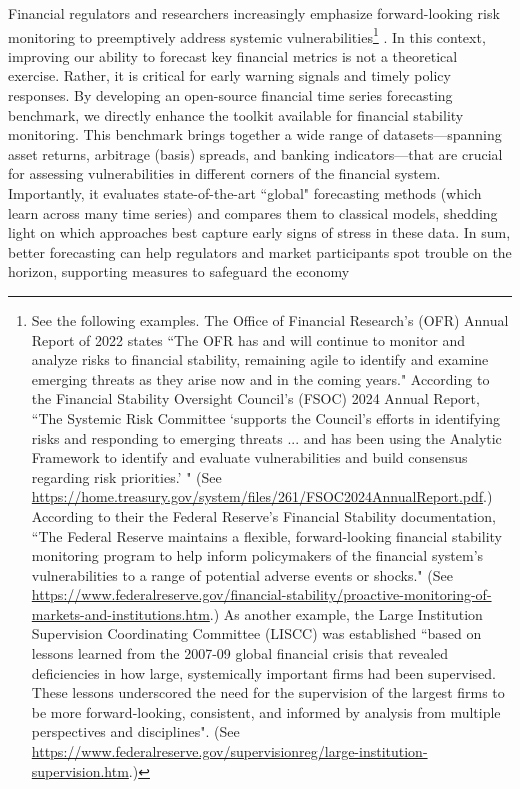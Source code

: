 \documentclass{article}
\begin{document}
Financial regulators and researchers increasingly emphasize forward-looking risk monitoring to preemptively address systemic vulnerabilities\footnote{
    See the following examples. The Office of Financial Research's (OFR) Annual Report of 2022 states ``The OFR has and will continue to monitor and analyze risks to financial
    stability, remaining agile to identify and examine emerging threats as they arise now and in the coming years." 
    According to the Financial Stability Oversight Council's (FSOC) 2024 Annual Report, ``The Systemic Risk Committee `supports the Council's efforts in identifying risks and responding to emerging threats
    ... and has been using the Analytic Framework to identify and evaluate vulnerabilities and build consensus regarding risk priorities.' " (See \url{https://home.treasury.gov/system/files/261/FSOC2024AnnualReport.pdf}.)
    According to their the Federal Reserve's Financial Stability documentation, ``The Federal Reserve maintains a flexible, forward-looking financial stability monitoring program to help inform policymakers of the financial system's vulnerabilities to a range of potential adverse events or shocks." (See \url{https://www.federalreserve.gov/financial-stability/proactive-monitoring-of-markets-and-institutions.htm}.) 
    As another example, the Large Institution Supervision Coordinating Committee (LISCC) was established ``based on lessons learned from the 2007-09 global financial crisis that revealed deficiencies in how large, systemically important firms had been supervised. These lessons underscored the need for the supervision of the largest firms to be more forward-looking, consistent, and informed by analysis from multiple perspectives and disciplines". (See \url{https://www.federalreserve.gov/supervisionreg/large-institution-supervision.htm}.)
} \citep{Adrian2015}. 
In this context, improving our ability to forecast key financial metrics is not a theoretical exercise. Rather,
it is critical for early warning signals and timely policy responses. 
By developing an open-source financial time series forecasting benchmark, we directly enhance the toolkit available for financial stability monitoring. This benchmark brings together a wide range of datasets---spanning asset returns, arbitrage (basis) spreads, and banking indicators---that are crucial for assessing vulnerabilities in different corners of the financial system. Importantly, it evaluates state-of-the-art ``global" forecasting methods (which learn across many time series) and compares them to classical models, shedding light on which approaches best capture early signs of stress in these data. In sum, better forecasting can help regulators and market participants spot trouble on the horizon, supporting measures to safeguard the economy
\end{document}
